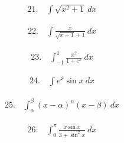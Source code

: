 \documentclass[autodetect-engine,ja=standard, 10.5pt, a4paper, titlepage]{bxjsarticle}
\numberwithin{equation}{section} %
\begin{document}
  \begin{fleqn}[0pt]
    \begin{align*}
      21.\quad \int \sqrt{x^2 + 1} \:dx
    \end{align*}
  \end{fleqn}
  \begin{fleqn}[0pt]
    \begin{align*}
      22.\quad \int \frac{x}{\sqrt{x+1} + 1} \:dx
    \end{align*}
  \end{fleqn}
  \begin{fleqn}[0pt]
    \begin{align*}
      23.\quad \int_{-1}^{1} \frac{x^2}{1 + e^x} \:dx
    \end{align*}
  \end{fleqn}
  \begin{fleqn}[0pt]
    \begin{align*}
      24.\quad \int e^x \sin x \:dx
    \end{align*}
  \end{fleqn}
  \begin{fleqn}[0pt]
    \begin{align*}
      25.\quad \int_{\alpha}^{\beta} (x-\alpha)^n (x-\beta) \: dx
    \end{align*}
  \end{fleqn}
  \begin{fleqn}[0pt]
    \begin{align*}
      26.\quad \int_{0}^{\pi} \frac{x\sin x}{3 + \sin^2 x} \:dx
    \end{align*}
  \end{fleqn}

 
\end{document}
